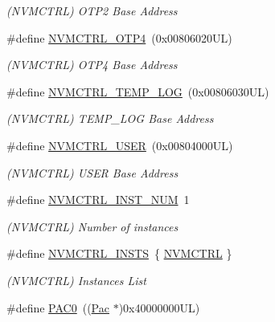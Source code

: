 \begin{DoxyCompactItemize}
\begin{DoxyCompactList}\small\item\em (N\+V\+M\+C\+T\+RL) O\+T\+P2 Base Address \end{DoxyCompactList}\item 
\#define \mbox{\hyperlink{group___s_a_m_d21_g15_l__base_ga138b4aca5a0446a745fe143c1dca8165}{N\+V\+M\+C\+T\+R\+L\+\_\+\+O\+T\+P4}}~(0x00806020\+U\+L)
\begin{DoxyCompactList}\small\item\em (N\+V\+M\+C\+T\+RL) O\+T\+P4 Base Address \end{DoxyCompactList}\item 
\#define \mbox{\hyperlink{group___s_a_m_d21_g15_l__base_gae900d443ec6d7cf1c90d21b6662fa447}{N\+V\+M\+C\+T\+R\+L\+\_\+\+T\+E\+M\+P\+\_\+\+L\+OG}}~(0x00806030\+U\+L)
\begin{DoxyCompactList}\small\item\em (N\+V\+M\+C\+T\+RL) T\+E\+M\+P\+\_\+\+L\+OG Base Address \end{DoxyCompactList}\item 
\#define \mbox{\hyperlink{group___s_a_m_d21_g15_l__base_ga7a7a83a5753fa323b61536e396083c99}{N\+V\+M\+C\+T\+R\+L\+\_\+\+U\+S\+ER}}~(0x00804000\+U\+L)
\begin{DoxyCompactList}\small\item\em (N\+V\+M\+C\+T\+RL) U\+S\+ER Base Address \end{DoxyCompactList}\item 
\#define \mbox{\hyperlink{group___s_a_m_d21_g15_l__base_ga13ad0ecfdddf1ba98ff430146e106ad9}{N\+V\+M\+C\+T\+R\+L\+\_\+\+I\+N\+S\+T\+\_\+\+N\+UM}}~1
\begin{DoxyCompactList}\small\item\em (N\+V\+M\+C\+T\+RL) Number of instances \end{DoxyCompactList}\item 
\#define \mbox{\hyperlink{group___s_a_m_d21_g15_l__base_ga89f9b65723089d64dc46c4c5ac60d1e0}{N\+V\+M\+C\+T\+R\+L\+\_\+\+I\+N\+S\+TS}}~\{ \mbox{\hyperlink{group___s_a_m_d21_j18_a__base_gad18608913d3d6e423f3a79d84348910a}{N\+V\+M\+C\+T\+RL}} \}
\begin{DoxyCompactList}\small\item\em (N\+V\+M\+C\+T\+RL) Instances List \end{DoxyCompactList}\item 
\#define \mbox{\hyperlink{group___s_a_m_d21_g15_l__base_ga193491199100ba87dcdbb8d50837fb62}{P\+A\+C0}}~((\mbox{\hyperlink{struct_pac}{Pac}}      $\ast$)0x40000000\+U\+L)

\end{DoxyCompactItemize}
